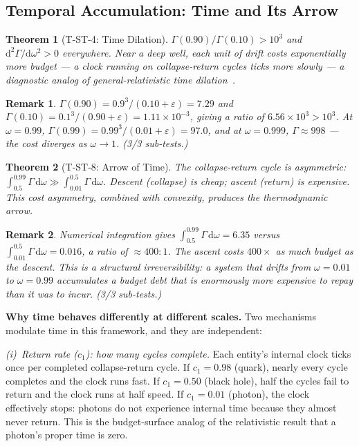 \documentclass[
  aps,
  prd,
  twocolumn,
  superscriptaddress,
  nofootinbib,
  floatfix
]{revtex4-2}
\newtheorem{theorem}{Theorem}
\newtheorem{remark}{Remark}
\newcommand{\Gam}{\Gamma}
\newcommand{\eps}{\varepsilon}
\newcommand{\dd}{\mathrm{d}}
\begin{document}
\subsection{Temporal Accumulation: Time and Its Arrow}\label{sec:time}

\begin{theorem}[T-ST-4: Time Dilation]\label{thm:T4}
$\Gam(0.90)/\Gam(0.10) > 10^3$ and $\dd^2\Gam/\dd\omega^2 > 0$
everywhere.  Near a deep well, each unit of drift costs
exponentially more budget --- a clock running on collapse-return
cycles ticks more slowly --- a diagnostic analog of
general-relativistic time
dilation~\cite{einstein1916gr,misner1973gravitation}.
\end{theorem}

\begin{remark}
$\Gam(0.90) = 0.9^3/(0.10 + \eps) = 7.29$ and
$\Gam(0.10) = 0.1^3/(0.90 + \eps) = 1.11 \times 10^{-3}$,
giving a ratio of $6.56 \times 10^{3} > 10^{3}$.
At $\omega = 0.99$, $\Gam(0.99) = 0.99^3/(0.01 + \eps)
= 97.0$, and at $\omega = 0.999$, $\Gam \approx 998$ ---
the cost diverges as $\omega \to 1$.  (3/3 sub-tests.)
\end{remark}

\begin{theorem}[T-ST-8: Arrow of Time]\label{thm:T8}
The collapse-return cycle is asymmetric:
$\int_{0.5}^{0.99}\Gam\,\dd\omega \gg
\int_{0.01}^{0.5}\Gam\,\dd\omega$.
Descent (collapse) is cheap; ascent (return) is expensive.
This cost asymmetry, combined with convexity, produces the
thermodynamic arrow.
\end{theorem}

\begin{remark}
Numerical integration gives
$\int_{0.5}^{0.99}\Gam\,\dd\omega = 6.35$ versus
$\int_{0.01}^{0.5}\Gam\,\dd\omega = 0.016$,
a ratio of $\approx 400\!:\!1$.  The ascent costs
$400\times$ as much budget as the descent.  This is a
structural irreversibility: a system that drifts from
$\omega = 0.01$ to $\omega = 0.99$ accumulates a budget
debt that is enormously more expensive to repay than it
was to incur.  (3/3 sub-tests.)
\end{remark}

\textbf{Why time behaves differently at different scales.}
Two mechanisms modulate time in this framework, and they
are independent:

\emph{(i)~Return rate ($c_1$): how many cycles complete.}
Each entity's internal clock ticks once per completed
collapse-return cycle.  If $c_1 = 0.98$ (quark), nearly
every cycle completes and the clock runs fast.  If $c_1 =
0.50$ (black hole), half the cycles fail to return and
the clock runs at half speed.  If $c_1 = 0.01$ (photon),
the clock effectively stops: photons do not experience
internal time because they almost never return.  This is
the budget-surface analog of the relativistic result that
a photon's proper time is zero.
\end{document}
